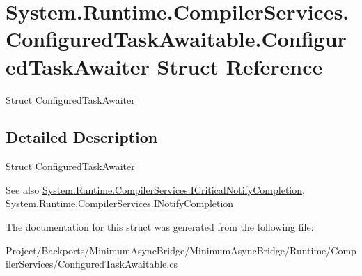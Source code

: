 \hypertarget{struct_system_1_1_runtime_1_1_compiler_services_1_1_configured_task_awaitable_1_1_configured_task_awaiter}{}\section{System.\+Runtime.\+Compiler\+Services.\+Configured\+Task\+Awaitable.\+Configured\+Task\+Awaiter Struct Reference}
\label{struct_system_1_1_runtime_1_1_compiler_services_1_1_configured_task_awaitable_1_1_configured_task_awaiter}


Struct \hyperlink{struct_system_1_1_runtime_1_1_compiler_services_1_1_configured_task_awaitable_1_1_configured_task_awaiter}{Configured\+Task\+Awaiter}  




\subsection{Detailed Description}
Struct \hyperlink{struct_system_1_1_runtime_1_1_compiler_services_1_1_configured_task_awaitable_1_1_configured_task_awaiter}{Configured\+Task\+Awaiter} 

\begin{DoxySeeAlso}{See also}
\hyperlink{interface_system_1_1_runtime_1_1_compiler_services_1_1_i_critical_notify_completion}{System.\+Runtime.\+Compiler\+Services.\+I\+Critical\+Notify\+Completion}, \hyperlink{interface_system_1_1_runtime_1_1_compiler_services_1_1_i_notify_completion}{System.\+Runtime.\+Compiler\+Services.\+I\+Notify\+Completion}


\end{DoxySeeAlso}


The documentation for this struct was generated from the following file\+:\begin{DoxyCompactItemize}
\item 
Project/\+Backports/\+Minimum\+Async\+Bridge/\+Minimum\+Async\+Bridge/\+Runtime/\+Compiler\+Services/Configured\+Task\+Awaitable.\+cs\end{DoxyCompactItemize}
